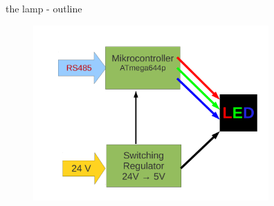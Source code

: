 \documentclass{beamer}
\begin{document}
  \begin{frame}{the lamp - outline}
    \begin{figure}
    \begin{center}
    \includegraphics[width=9cm]{bilder/led_12v_rs485.pdf}
    \end{center}
    \end{figure}
  \end{frame}
\end{document}
